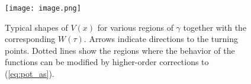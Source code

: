\documentclass[12pt]{article}
\begin{document}
\begin{figure}[h]
    \centering
    \texttt{[image: image.png]} %
    \caption{Typical shapes of \( V(x) \) for various regions of \( \gamma \) together with the corresponding \( W(\tau) \). Arrows indicate directions to the turning points. Dotted lines show the regions where the behavior of the functions can be modified by higher-order corrections to (\ref{eq:pot_as}).}
    \label{fig:shapes}
\end{figure}
\end{document}

